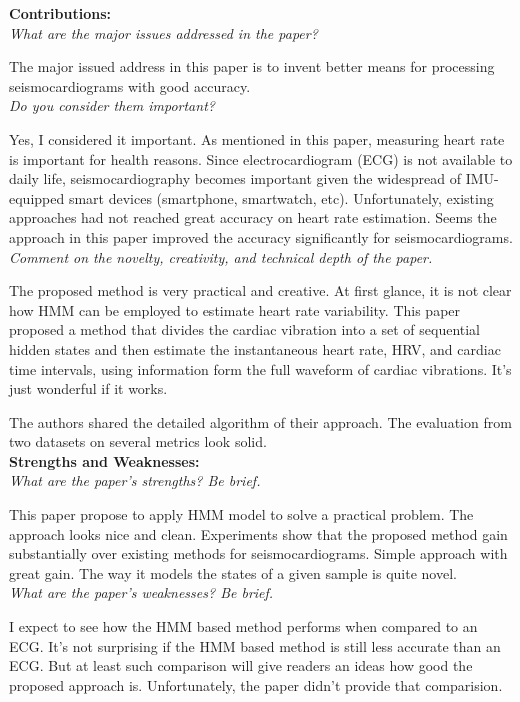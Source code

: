 \documentclass[11pt, oneside]{article}   	%
\begin{document}
\noindent \textbf{Contributions:}\\
\emph{What are the major issues addressed in the paper?}

The major issued address in this paper is to invent better means for processing seismocardiograms with good accuracy. \\


\noindent \emph{Do you consider them important?}

Yes, I considered it important. As mentioned in this paper, measuring heart rate is important for health reasons. Since electrocardiogram (ECG) is not available to daily life, seismocardiography becomes important given the widespread of IMU-equipped smart devices (smartphone, smartwatch, etc). Unfortunately, existing approaches had not reached great accuracy on heart rate estimation. Seems the approach in this paper improved the accuracy significantly for seismocardiograms. \\


\noindent \emph{Comment on the novelty, creativity, and technical depth of the paper.}

The proposed method is very practical and creative. At first glance, it is not clear how HMM can be employed to estimate heart rate variability. This paper proposed a method that divides the cardiac vibration into a set of sequential hidden states and then estimate the instantaneous heart rate, HRV, and cardiac time intervals, using information form the full waveform of cardiac vibrations.  It's just wonderful if it works.

The authors shared the detailed algorithm of their approach. The evaluation from two datasets on several metrics look solid.\\



\noindent \textbf{Strengths and Weaknesses:}\\
\emph{What are the paper’s strengths? Be brief.}

This paper propose to apply HMM model to solve a practical problem. The approach looks nice and clean. Experiments show that the proposed method gain substantially over existing methods for seismocardiograms. Simple approach with great gain.  The way it models the states of a given sample is quite novel.\\



\noindent \emph{What are the paper's weaknesses? Be brief.}

I expect to see how the HMM based method performs when compared to an ECG. It's not surprising if the HMM based method is still less accurate than an ECG. But at least such comparison will give readers an ideas how good the proposed approach is. Unfortunately, the paper didn't provide that comparision.
\end{document}
